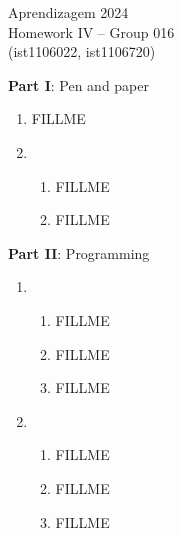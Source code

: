\documentclass[12pt]{article}
\begin{document}
\center
Aprendizagem 2024\\
Homework IV -- Group 016\\
(ist1106022, ist1106720)\vskip 1cm

\large{\textbf{Part I}: Pen and paper}\normalsize
\begin{enumerate}[leftmargin=\labelsep, label=\textbf{\arabic*.)}]
    \item FILLME
    \item \begin{enumerate}[label=\textbf{\alph*.)}]
              \item FILLME
              \item FILLME
          \end{enumerate}
\end{enumerate}

\large{\textbf{Part II}: Programming}\normalsize
\begin{enumerate}[leftmargin=\labelsep, label=\textbf{\arabic*.)},start=1]
    \item \begin{enumerate}[label=\textbf{\alph*.)}]
              \item FILLME
              \item FILLME
              \item FILLME
          \end{enumerate}
    \item \begin{enumerate}[label=\textbf{\alph*.)}]
              \item FILLME
              \item FILLME
              \item FILLME
          \end{enumerate}
\end{enumerate}
\end{document}
